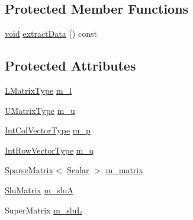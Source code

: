 \subsection*{Protected Member Functions}
\begin{DoxyCompactItemize}
\item 
\hyperlink{group___u_a_v_objects_plugin_ga444cf2ff3f0ecbe028adce838d373f5c}{void} \hyperlink{class_sparse_l_u_3_01_matrix_type_00_01_super_l_u_01_4_a89b28568353287ecd38f38f8f1c5f60d}{extract\-Data} () const 
\end{DoxyCompactItemize}
\subsection*{Protected Attributes}
\begin{DoxyCompactItemize}
\item 
\hyperlink{class_sparse_l_u_3_01_matrix_type_00_01_super_l_u_01_4_a456d27de5a655bef64e8d749e80e3aad}{L\-Matrix\-Type} \hyperlink{class_sparse_l_u_3_01_matrix_type_00_01_super_l_u_01_4_a082c53c0ea1cb1547e88f6a602b3216c}{m\-\_\-l}
\item 
\hyperlink{class_sparse_l_u_3_01_matrix_type_00_01_super_l_u_01_4_ae359d4920c56a9ac93bc728bc0d04b77}{U\-Matrix\-Type} \hyperlink{class_sparse_l_u_3_01_matrix_type_00_01_super_l_u_01_4_ac97819e7370a01935c33b6309df603fb}{m\-\_\-u}
\item 
\hyperlink{class_sparse_l_u_3_01_matrix_type_00_01_super_l_u_01_4_a904f8c9f7dcd198fcc6fd897cec1ac8e}{Int\-Col\-Vector\-Type} \hyperlink{class_sparse_l_u_3_01_matrix_type_00_01_super_l_u_01_4_a53e9ea0364b931aec6c28fe65b82173a}{m\-\_\-p}
\item 
\hyperlink{class_sparse_l_u_3_01_matrix_type_00_01_super_l_u_01_4_a341f04a651379c2395a17abc5a566ccf}{Int\-Row\-Vector\-Type} \hyperlink{class_sparse_l_u_3_01_matrix_type_00_01_super_l_u_01_4_aaa8b743a946f2e1ad0c2828fe7149576}{m\-\_\-q}
\item 
\hyperlink{class_sparse_matrix}{Sparse\-Matrix}$<$ \hyperlink{class_sparse_l_u_3_01_matrix_type_00_01_super_l_u_01_4_ae21a6c1f9f89d9345035a47e161d8ac7}{Scalar} $>$ \hyperlink{class_sparse_l_u_3_01_matrix_type_00_01_super_l_u_01_4_a85a2c468e0ae13c1c6b12c47d119ef71}{m\-\_\-matrix}
\item 
\hyperlink{struct_slu_matrix}{Slu\-Matrix} \hyperlink{class_sparse_l_u_3_01_matrix_type_00_01_super_l_u_01_4_aa35e7477b877824fa14eb1f759f8eb3b}{m\-\_\-slu\-A}
\item 
Super\-Matrix \hyperlink{class_sparse_l_u_3_01_matrix_type_00_01_super_l_u_01_4_acadc22ec35946abdb3ba2a7b23804dac}{m\-\_\-slu\-L}

\end{DoxyCompactItemize}
